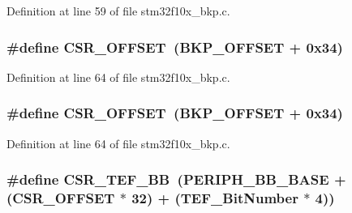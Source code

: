 Definition at line 59 of file stm32f10x\+\_\+bkp.\+c.

\subsubsection[{\texorpdfstring{C\+S\+R\+\_\+\+O\+F\+F\+S\+ET}{CSR_OFFSET}}]{\setlength{\rightskip}{0pt plus 5cm}\#define C\+S\+R\+\_\+\+O\+F\+F\+S\+ET~({\bf B\+K\+P\+\_\+\+O\+F\+F\+S\+ET} + 0x34)}\hypertarget{group___b_k_p___private___defines_ga984cbe73312b6d3d355c5053763d499a}{}\label{group___b_k_p___private___defines_ga984cbe73312b6d3d355c5053763d499a}


Definition at line 64 of file stm32f10x\+\_\+bkp.\+c.

\subsubsection[{\texorpdfstring{C\+S\+R\+\_\+\+O\+F\+F\+S\+ET}{CSR_OFFSET}}]{\setlength{\rightskip}{0pt plus 5cm}\#define C\+S\+R\+\_\+\+O\+F\+F\+S\+ET~({\bf B\+K\+P\+\_\+\+O\+F\+F\+S\+ET} + 0x34)}\hypertarget{group___b_k_p___private___defines_ga984cbe73312b6d3d355c5053763d499a}{}\label{group___b_k_p___private___defines_ga984cbe73312b6d3d355c5053763d499a}


Definition at line 64 of file stm32f10x\+\_\+bkp.\+c.

\subsubsection[{\texorpdfstring{C\+S\+R\+\_\+\+T\+E\+F\+\_\+\+BB}{CSR_TEF_BB}}]{\setlength{\rightskip}{0pt plus 5cm}\#define C\+S\+R\+\_\+\+T\+E\+F\+\_\+\+BB~({\bf P\+E\+R\+I\+P\+H\+\_\+\+B\+B\+\_\+\+B\+A\+SE} + ({\bf C\+S\+R\+\_\+\+O\+F\+F\+S\+ET} $\ast$ 32) + ({\bf T\+E\+F\+\_\+\+Bit\+Number} $\ast$ 4))}\hypertarget{group___b_k_p___private___defines_gad60539cc791a26701d414aee529ea203}{}\label{group___b_k_p___private___defines_gad60539cc791a26701d414aee529ea203}


